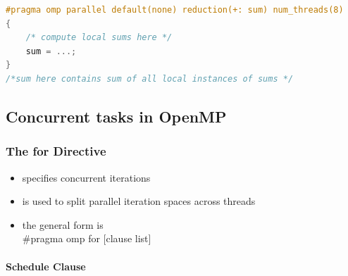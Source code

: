 \begin{lstlisting}[language=C++]
#pragma omp parallel default(none) reduction(+: sum) num_threads(8)
{
    /* compute local sums here */
    sum = ...;
}
/*sum here contains sum of all local instances of sums */
\end{lstlisting}

\hypertarget{concurrent-tasks-in-openmp}{%
\subsection{Concurrent tasks in
OpenMP}\label{concurrent-tasks-in-openmp}}

\hypertarget{the-for-directive}{%
\subsubsection{The for Directive}\label{the-for-directive}}

\begin{itemize}
\tightlist
\item
  specifies concurrent iterations
\item
  is used to split parallel iteration spaces across threads
\item
  the general form is\\
  \#pragma omp for {[}clause list{]}
\end{itemize}

\hypertarget{schedule-clause}{%
\paragraph{Schedule Clause}\label{schedule-clause}}

